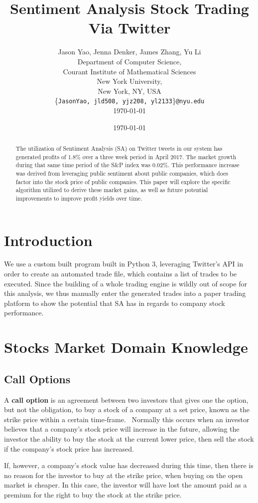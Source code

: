 \documentclass[11pt]{article}
\title{Sentiment Analysis Stock Trading Via Twitter}
\author{
Jason Yao, Jenna Denker, James Zhang, Yu Li\\
Department of Computer Science,\\
Courant Institute of Mathematical Sciences\\
New York University,\\
New York, NY, USA\\
\{{\tt JasonYao, jld508, yjz208, yl2133}\}{\tt @nyu.edu}\\
\today
}
\date{\today}
\begin{document}
\maketitle
\begin{abstract}
The utilization of Sentiment Analysis (SA) on
Twitter tweets in our system has generated
profits of 1.8\% over a three week period in
April 2017. The market growth during that same
time period of the S\&P index was 0.02\%.
This performance increase was derived from
leveraging public sentiment about public
companies, which does factor into the stock
price of public companies. This paper will explore
the specific algorithm utilized to derive these
market gains, as well as future potential improvements
to improve profit yields over time.
\end{abstract}

\section{Introduction}
We use a custom built program built in Python 3,
leveraging Twitter's API in order to create an
automated trade file, which contains a list of
trades to be executed. Since the building of a
whole trading engine is wildly out of scope for
this analysis, we thus manually enter the generated
trades into a paper trading platform to show
the potential that SA has in regards to company
stock performance.

\section{Stocks Market Domain Knowledge}
\subsection{Call Options}
A {\bf call option} is an agreement between two investors that gives one the option, but not the obligation, to buy a stock of a company at a set price, known as the strike price within a certain time-frame.~\cite{call} Normally this occurs when an investor believes that a company's stock price will increase in the future, allowing the investor the ability to buy the stock at the current lower price, then sell the stock if the company's stock price has increased.

If, however, a company's stock value has decreased during this time, then there is no reason for the investor to buy at the strike price, when buying on the open market is cheaper. In this case, the investor will have lost the amount paid as a premium for the right to buy the stock at the strike price.
\end{document}
